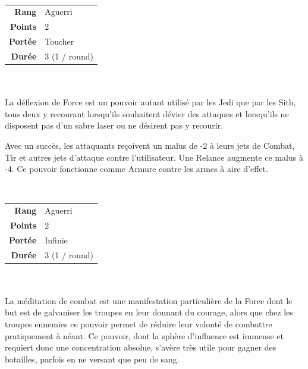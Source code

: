 \begin{description}[align=left] 

    \item [Déflexion de Force] ~ \\

        \begin{tabular}{ r l }
            \textbf{Rang}    & Aguerri \\
            \textbf{Points}  & 2 \\
            \textbf{Portée}  & Toucher \\
            \textbf{Durée}   & 3 (1 / round) \\
        \end{tabular}
        \\ \\
        La déflexion de Force est un pouvoir autant utilisé par les Jedi que par les Sith, tous deux y recourant lorsqu’ils souhaitent dévier des attaques et lorsqu’ils ne disposent pas d’un sabre laser ou ne désirent pas y recourir.

        Avec un succès, les attaquants reçoivent un malus de -2 à leurs jets de Combat, Tir et autres jets d’attaque contre l’utilisateur. Une Relance augmente ce malus à -4. Ce pouvoir fonctionne comme Armure contre les armes à aire d’effet.
        \\

    \item [Méditation de Combat] ~ \\

        \begin{tabular}{ r l }
            \textbf{Rang}    & Aguerri \\
            \textbf{Points}  & 2 \\
            \textbf{Portée}  & Infinie \\
            \textbf{Durée}   & 3 (1 / round) \\
        \end{tabular}
        \\ \\
        La méditation de combat est une manifestation particulière de la Force dont le but est de galvaniser les troupes en leur donnant du courage, alors que chez les troupes ennemies ce pouvoir permet de réduire leur volonté de combattre pratiquement à néant. Ce pouvoir, dont la sphère d’influence est immense et requiert donc une concentration absolue, s’avère très utile pour gagner des batailles, parfois en ne versant que peu de sang.


\end{description}
